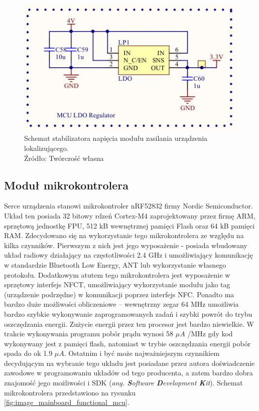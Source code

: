 \begin{figure}[H]
	\centering
	\includegraphics[width=12cm]{img/schematics/mainboard_power_ldo.jpg}
	\caption{Schemat stabilizatora napięcia modułu zasilania urządzenia lokalizującego. \\ Źródło: Twórczość własna}
	\label{fig:image_mainboard_power_ldo}
\end{figure}

\subsection{Moduł mikrokontrolera}

Serce urządzenia stanowi mikrokontroler nRF52832 firmy Nordic Semiconductor. Układ ten posiada 32 bitowy rdzeń Cortex-M4 zaprojektowany przez firmę ARM, sprzętową jednostkę FPU, 512 kB wewnętrznej pamięci Flash oraz 64 kB pamięci RAM. Zdecydowano się na wykorzystanie tego mikrokontrolera ze względu na kilka czynników. Pierwszym z nich jest jego wyposażenie - posiada wbudowany układ radiowy działający na częstotliwości 2.4 GHz i umożliwiający komunikację w standardzie Bluetooth Low Energy, ANT lub wykorzystanie własnego protokołu. Dodatkowym atutem tego mikrokontrolera jest wyposażenie w sprzętowy interfejs NFCT, umożliwiający wykorzystanie modułu jako tag (urządzenie podrzędne) w komunikacji poprzez interfejs NFC. Ponadto ma bardzo duże możliwości obliczeniowe – wewnętrzny zegar 64 MHz umożliwia bardzo szybkie wykonywanie zaprogramowanych zadań i szybki powrót do trybu oszczędzania energii. Zużycie energii przez ten procesor jest bardzo niewielkie. W trakcie wykonywania programu pobór prądu wynosi 58 $\mu A$ /MHz gdy kod wykonywany jest z pamięci flash, natomiast w trybie oszczędzania energii pobór spada do ok 1.9 $\mu A$. Ostatnim i być może najważniejszym czynnikiem decydującym na wybranie tego układu jest posiadane przez autora doświadczenie zawodowe w programowaniu układów od tego producenta, a zatem bardzo dobra znajomość jego możliwości i SDK (\textit{ang. \textbf{S}oftware \textbf{D}evelopment \textbf{K}it}). Schemat mikrokontrolera przedstawiono na rysunku \ref{fig:image_mainboard_functional_mcu}.

